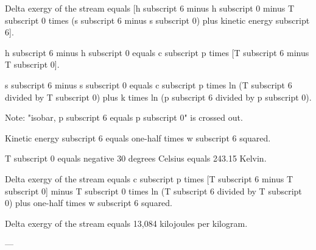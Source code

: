 Delta exergy of the stream equals [h subscript 6 minus h subscript 0 minus T subscript 0 times (s subscript 6 minus s subscript 0) plus kinetic energy subscript 6].  

h subscript 6 minus h subscript 0 equals c subscript p times [T subscript 6 minus T subscript 0].  

s subscript 6 minus s subscript 0 equals c subscript p times ln (T subscript 6 divided by T subscript 0) plus k times ln (p subscript 6 divided by p subscript 0).  

Note: "isobar, p subscript 6 equals p subscript 0" is crossed out.  

Kinetic energy subscript 6 equals one-half times w subscript 6 squared.  

T subscript 0 equals negative 30 degrees Celsius equals 243.15 Kelvin.  

Delta exergy of the stream equals c subscript p times [T subscript 6 minus T subscript 0] minus T subscript 0 times ln (T subscript 6 divided by T subscript 0) plus one-half times w subscript 6 squared.  

Delta exergy of the stream equals 13,084 kilojoules per kilogram.  

---